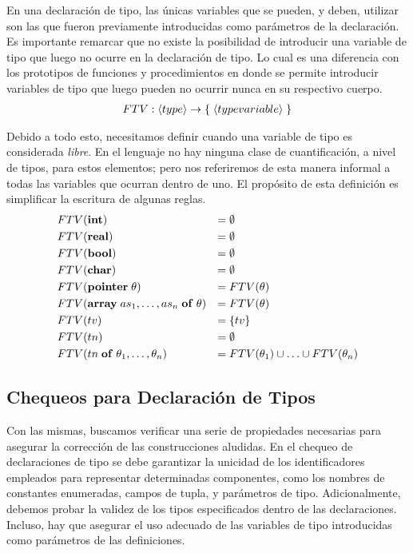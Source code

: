 En una declaración de tipo, las únicas variables que se pueden, y deben, utilizar son las que fueron previamente introducidas como parámetros de la declaración. Es importante remarcar que no existe la posibilidad de introducir una variable de tipo que luego no ocurre en la declaración de tipo. Lo cual es una diferencia con los prototipos de funciones y procedimientos en donde se permite introducir variables de tipo que luego pueden no ocurrir nunca en su respectivo cuerpo.
\begin{gather*}
FTV: \langle type \rangle \rightarrow \{ \; \langle typevariable \rangle \; \}
\end{gather*}

Debido a todo esto, necesitamos definir cuando una variable de tipo es considerada \textit{libre}.
En el lenguaje no hay ninguna clase de cuantificación, a nivel de tipos, para estos elementos; pero nos referiremos de esta manera informal a todas las variables que ocurran dentro de uno.
El propósito de esta definición es simplificar la escritura de algunas reglas. %
\begin{align*}
&FTV(\mathbf{int})
&=&\;
\emptyset
\\
&FTV(\mathbf{real})
&=&\;
\emptyset
\\
&FTV(\mathbf{bool})
&=&\;
\emptyset
\\
&FTV(\mathbf{char})
&=&\;
\emptyset
\\
&FTV(\mathbf{pointer} \; \theta)
&=&\;
FTV(\theta)
\\
&FTV(\mathbf{array} \; as_1, \ldots, as_n \; \mathbf{of} \; \theta)
&=&\;
FTV(\theta)
\\
&FTV(tv)
&=&\;
\{ tv \}
\\
&FTV(tn)
&=&\;
\emptyset
\\
&FTV(tn \; \mathbf{of} \; \theta_1, \ldots, \theta_n)
&=&\;
FTV(\theta_1) \cup \ldots \cup FTV(\theta_n)
\end{align*}

\subsection{Chequeos para Declaración de Tipos}

Con las mismas, buscamos verificar una serie de propiedades necesarias para asegurar la corrección de las construcciones aludidas.
En el chequeo de declaraciones de tipo se debe garantizar la unicidad de los identificadores empleados para representar determinadas componentes, como los nombres de constantes enumeradas, campos de tupla, y parámetros de tipo.
Adicionalmente, debemos probar la validez de los tipos especificados dentro de las declaraciones.
Incluso, hay que asegurar el uso adecuado de las variables de tipo introducidas como parámetros de las definiciones.

